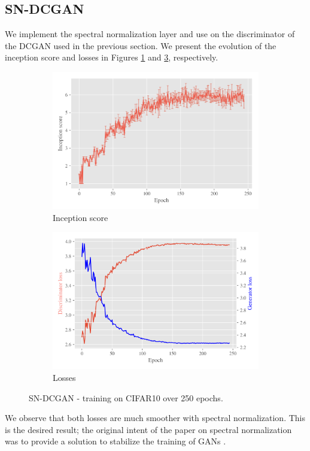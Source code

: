 \subsection{SN-DCGAN}
\label{sec:exp-sndcgan}
We implement the spectral normalization layer and use on the discriminator of the DCGAN used in the previous section. We present the evolution of the inception score and losses in Figures \ref{fig:exp-sndcgan-is} and \ref{fig:exp-sndcgan-losses}, respectively.
   
\begin{figure}[t!]
    \centering
    \begin{subfigure}[t]{0.49\textwidth}
        \centering
		\includegraphics[width=\textwidth]{../code/results/figures/sndcgan_cifar10_is.png}
		\caption{Inception score}
		\label{fig:exp-sndcgan-is}
    \end{subfigure}
    \begin{subfigure}[t]{0.49\textwidth}
        \centering
        \includegraphics[width=\textwidth]{../code/results/figures/sndcgan_cifar10_losses.png}
		\caption{Losses}
		\label{fig:exp-sndcgan-losses}
    \end{subfigure}
    \caption{SN-DCGAN - training on CIFAR10 over 250 epochs.}
\end{figure}

We observe that both losses are much smoother with spectral normalization. This is the desired result; the original intent of the paper on spectral normalization was to provide a solution to stabilize the training of GANs \cite{miyato2018spectral}. 